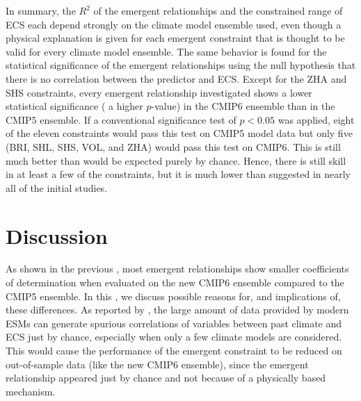 In summary, the $R^2$ of the emergent relationships and the constrained range
of \ac{ECS} each depend strongly on the climate model ensemble used, even
though a physical explanation is given for each emergent constraint that is
thought to be valid for every climate model ensemble. The same behavior is
found for the statistical significance of the emergent relationships using the
null hypothesis that there is no correlation between the predictor and
\ac{ECS}. Except for the ZHA and SHS constraints, every emergent relationship
investigated shows a lower statistical significance (\ie{} a higher $p$-value)
in the \acs{CMIP}6 ensemble than in the \acs{CMIP}5 ensemble. If a conventional
significance test of $p < 0.05$ was applied, eight of the eleven constraints
would pass this test on \acs{CMIP}5 model data but only five (BRI, SHL, SHS,
VOL, and ZHA) would pass this test on \acs{CMIP}6. This is still much better
than would be expected purely by chance. Hence, there is still skill in at
least a few of the constraints, but it is much lower than suggested in nearly
all of the initial studies.


\section{Discussion}
\label{sec:05:discussion}

As shown in the previous ,
most emergent relationships show smaller coefficients of determination when
evaluated on the new \acs{CMIP}6 ensemble compared to the \acs{CMIP}5 ensemble.
In this , we discuss possible reasons for, and
implications of, these differences. As reported by \textcite{Caldwell2014}, the
large amount of data provided by modern \acp{ESM} can generate spurious
correlations of variables between past climate and \ac{ECS} just by chance,
especially when only a few climate models are considered. This would cause the
performance of the emergent constraint to be reduced on out-of-sample data
(like the new \acs{CMIP}6 ensemble), since the emergent relationship appeared
just by chance and not because of a physically based mechanism.

